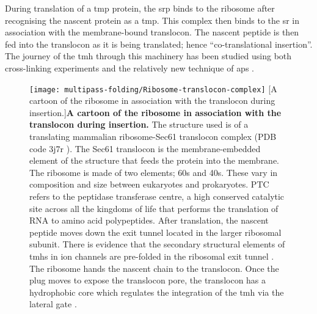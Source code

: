 During translation of a \gls{tmp} protein, the \gls{srp} binds to the ribosome after recognising the nascent protein as a \gls{tmp}.
This complex then binds to the \gls{sr} in association with the membrane\--bound translocon.
The nascent peptide is then fed into the translocon as it is being translated; hence ``co-translational insertion''.
The journey of the \gls{tmh} through this machinery has been studied using both  cross\--linking experiments and the relatively new technique of \gls{ap}s \cite{Cymer2015}.

\begin{figure}[!ht]
\centering
\texttt{[image: multipass-folding/Ribosome-translocon-complex]}
        [A cartoon of the ribosome in association with the translocon during insertion.]{\textbf{A cartoon of the ribosome in association with the translocon during insertion.}
        The structure used is of a translating mammalian ribosome-Sec61 translocon complex (PDB code 3j7r \cite{Voorhees2014}).
        The Sec61 translocon is the membrane\--embedded element of the structure that feeds the protein into the membrane.
        The ribosome is made of two elements; 60s and 40s.
        These vary in composition and size between eukaryotes and prokaryotes.
        PTC refers to the peptidase transferase centre, a high conserved catalytic site across all the kingdoms of life that performs the translation of RNA to amino acid polypeptides.
        After translation, the nascent peptide moves down the exit tunnel located in the larger ribosomal subunit.
        There is evidence that the secondary structural elements of  \gls{tmh}s in ion channels are pre\--folded in the ribosomal exit tunnel \cite{Lu2005, Tu2010a, Tu2014, Kudva2018}.
        The ribosome hands the nascent chain to the translocon.
        Once the plug moves to expose the translocon pore, the translocon has a hydrophobic core which regulates the integration of the \gls{tmh} via the lateral gate \cite{Junne2010}.
}
\label{fig:Ribosome-translocon-complex}
\end{figure}

